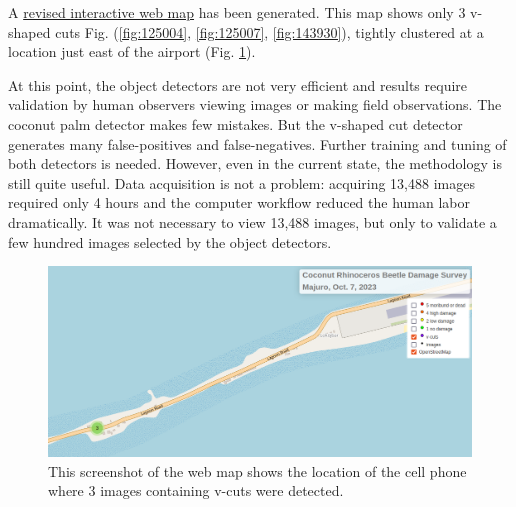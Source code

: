 \documentclass[12pt,letterpaper,english,bibliography=totocnumbered, abstract=on]{scrartcl}
\begin{document}
A \href{https://aubreymoore.github.io/Majuro-CRB-damage-map-1/webmap/#12/7.1082/171.2072}{revised interactive web map} has been generated. This map shows only 3 v-shaped cuts Fig. (\ref{fig:125004}, \ref{fig:125007}, \ref{fig:143930}), tightly clustered at a location just east of the airport (Fig. \ref{fig:v-cuts-location}).

At this point, the object detectors are not very efficient and results require validation by human observers viewing images or making field observations. The coconut palm detector makes few mistakes. But the v-shaped cut detector generates many false-positives and false-negatives. Further training and tuning of both detectors is needed. However, even in the current state, the methodology is still quite useful. Data acquisition is not a problem: acquiring 13,488 images required only 4 hours and the computer workflow reduced the human labor dramatically. It was not necessary to view 13,488 images, but only to validate a few hundred images selected by the object detectors. 

\begin{figure}
	\centering
	\includegraphics[width=\linewidth]{images/v-cuts-location}
	\caption{This screenshot of the web map shows the location of the cell phone  where 3 images containing v-cuts were detected.}
	\label{fig:v-cuts-location}
\end{figure}
\end{document}
